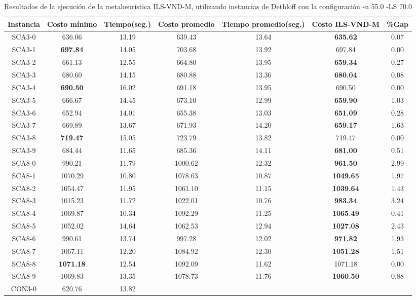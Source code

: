 \begin{table}[h]
\caption{Resultados de la ejecución de la metaheurística ILS-VND-M, utilizando instancias de Dethloff con la configuración -n 55.0 -LS 70.0}
\centering
\small
\begin{tabular}{c c c c c c c}
\hline\hline
Instancia & Costo mínimo & Tiempo(seg.) & Costo promedio & Tiempo promedio(seg.) & Costo ILS-VND-M & \%Gap \\ [0.5ex]
\hline
SCA3-0 & 636.06 & 13.19 & 
639.43 & 13.64 & \bf{635.62} & 
0.07\\SCA3-1 & \bf{697.84} & 14.05 & 
703.68 & 13.92 & 697.84 & 0.00\\
SCA3-2 & 661.13 & 12.55 & 
664.80 & 13.95 & \bf{659.34} & 
0.27\\SCA3-3 & 680.60 & 14.15 & 
680.88 & 13.36 & \bf{680.04} & 
0.08\\SCA3-4 & \bf{690.50} & 16.02 & 
691.18 & 13.95 & 690.50 & 0.00\\
SCA3-5 & 666.67 & 14.45 & 
673.10 & 12.99 & \bf{659.90} & 
1.03\\SCA3-6 & 652.94 & 14.01 & 
655.38 & 13.03 & \bf{651.09} & 
0.28\\SCA3-7 & 669.89 & 13.67 & 
671.93 & 14.20 & \bf{659.17} & 
1.63\\SCA3-8 & \bf{719.47} & 15.05 & 
723.79 & 13.82 & 719.47 & 0.00\\
SCA3-9 & 684.44 & 11.65 & 
685.36 & 14.11 & \bf{681.00} & 
0.51\\SCA8-0 & 990.21 & 11.79 & 
1000.62 & 12.32 & \bf{961.50} & 
2.99\\SCA8-1 & 1070.29 & 10.80 & 
1078.63 & 10.87 & \bf{1049.65} & 
1.97\\SCA8-2 & 1054.47 & 11.95 & 
1061.10 & 11.15 & \bf{1039.64} & 
1.43\\SCA8-3 & 1015.23 & 11.72 & 
1022.01 & 10.76 & \bf{983.34} & 
3.24\\SCA8-4 & 1069.87 & 10.34 & 
1092.29 & 11.25 & \bf{1065.49} & 
0.41\\SCA8-5 & 1052.02 & 14.64 & 
1062.53 & 12.94 & \bf{1027.08} & 
2.43\\SCA8-6 & 990.61 & 13.74 & 
997.28 & 12.02 & \bf{971.82} & 
1.93\\SCA8-7 & 1067.11 & 12.20 & 
1084.92 & 12.30 & \bf{1051.28} & 
1.51\\SCA8-8 & \bf{1071.18} & 12.54 & 
1092.09 & 11.62 & 1071.18 & 0.00\\
SCA8-9 & 1069.83 & 13.35 & 
1078.73 & 11.76 & \bf{1060.50} & 
0.88\\CON3-0 & 620.76 & 13.82 & 

\end{tabular}
\end{table}
